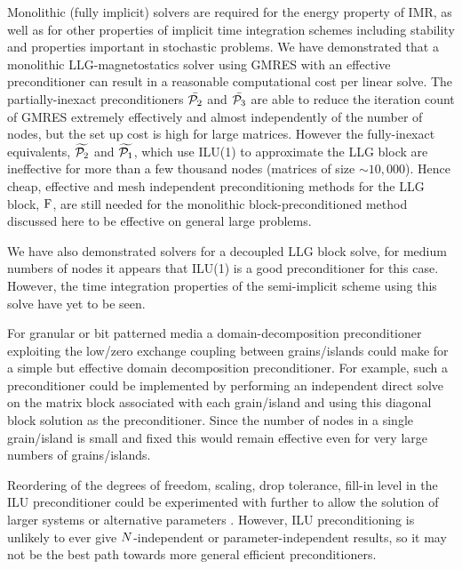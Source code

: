 Monolithic (fully implicit) solvers are required for the energy property of IMR, as well as for other properties of implicit time integration schemes including stability and properties important in stochastic problems.
We have demonstrated that a monolithic LLG-magnetostatics solver using GMRES with an effective preconditioner can result in a reasonable computational cost per linear solve.
The partially-inexact preconditioners $\bar{\mathcal{P}_2}$ and $\bar{\mathcal{P}_3}$ are able to reduce the iteration count of GMRES extremely effectively and almost independently of the number of nodes, but the set up cost is high for large matrices.
However the fully-inexact equivalents, $\widetilde{\mathcal{P}_2}$ and  $\widetilde{\mathcal{P}_1}$, which use ILU(1) to approximate the LLG block are ineffective for more than a few thousand nodes (\ie matrices of size $\sim 10,000$).
Hence cheap, effective and mesh independent preconditioning methods for the LLG block, $\mathrm{F}$, are still needed for the monolithic block-preconditioned method discussed here to be effective on general large problems.

We have also demonstrated solvers for a decoupled LLG block solve, for medium numbers of nodes it appears that ILU(1) is a good preconditioner for this case.
However, the time integration properties of the semi-implicit scheme using this solve have yet to be seen.


For granular or bit patterned media a domain-decomposition preconditioner exploiting the low/zero exchange coupling between grains/islands could make for a simple but effective domain decomposition preconditioner.
For example, such a preconditioner could be implemented by performing an independent direct solve on the matrix block associated with each grain/island and using this diagonal block solution as the preconditioner.
Since the number of nodes in a single grain/island is small and fixed this would remain effective even for very large numbers of grains/islands.

Reordering of the degrees of freedom, scaling, drop tolerance, fill-in level in the ILU preconditioner could be experimented with further to allow the solution of larger systems or alternative parameters \cite[287]{Saad2000}.
However, ILU preconditioning is unlikely to ever give $N$-independent or parameter-independent results, so it may not be the best path towards more general efficient preconditioners.




